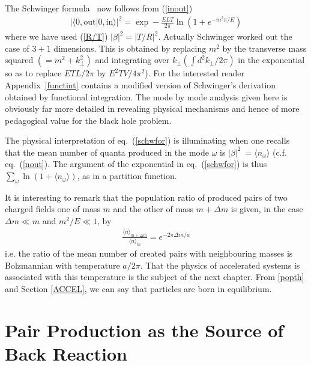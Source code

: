 \documentclass[12pt,oneside]{report}
\begin{document}
\par The Schwinger formula~\cite{Schw} now follows from (\ref{inout})
\begin{eqnarray}
\left|\langle 0, \mbox{out} | 0,\mbox{in} \rangle\right|^2 = \exp -
\frac{ELT}{2\pi} \ln \left(1 + e^{-m^2\pi/E} \right) 
\label{schwfor}
\end{eqnarray}
where we have used (\ref{R/T}) 
$|\beta|^2 = |T/R|^2$.  Actually Schwinger
worked out the case of $3+1$ dimensions.  This is obtained by replacing
$m^2$ by the transverse mass squared $(=m^2 + k^2_{\perp})$ and integrating
over $k_{\perp}(\int d^2 k_\perp/2\pi)$ in the exponential so as to
replace $ETL/2\pi$ by $E^2TV/4\pi^2$).  For the interested reader
Appendix~\ref{functint} contains a modified version of Schwinger's derivation 
obtained by functional integration.  
The mode by mode analysis
given here is obviously far more detailed in revealing physical
mechanisms and hence of more pedagogical value for the black hole
problem. 

The physical interpretation of eq.~(\ref{schwfor}) is 
illuminating when one recalls that the mean number of quanta produced in
the mode  $\omega$ is $|\beta|^2 \  =\langle
n_{\omega} \rangle$ (c.f. eq.~(\ref{nout}). The argument of 
the exponential in eq.~(\ref{schwfor}) is thus $\sum_{\omega}\ln (1+\langle 
n_{\omega} \rangle )$, as in 
a partition function.

It is interesting to remark that the population ratio of produced pairs of
two charged fields one of mass $m$ and the other of mass $m + \Delta m$
is given, in the case $\Delta m \ll m$ and $ m^2 /E \ll 1$, by
\begin{eqnarray}
\frac{\langle n \rangle_{m+ \Delta m}}{\langle n \rangle_{m}} 
= e^{- 2\pi \Delta m /a}
\label{popth}
\end{eqnarray}
i.e. the ratio of the mean number of created pairs with neighbouring masses
is Bolzmannian with temperature $a/2 \pi$. That the physics of accelerated 
systems is associated with this temperature is the subject of the next
chapter. From \ref{popth} and Section \ref{ACCEL}, we can say that particles are born in
equilibrium.


\section{Pair Production as the Source of Back Reaction}\label{pair}
\end{document}
